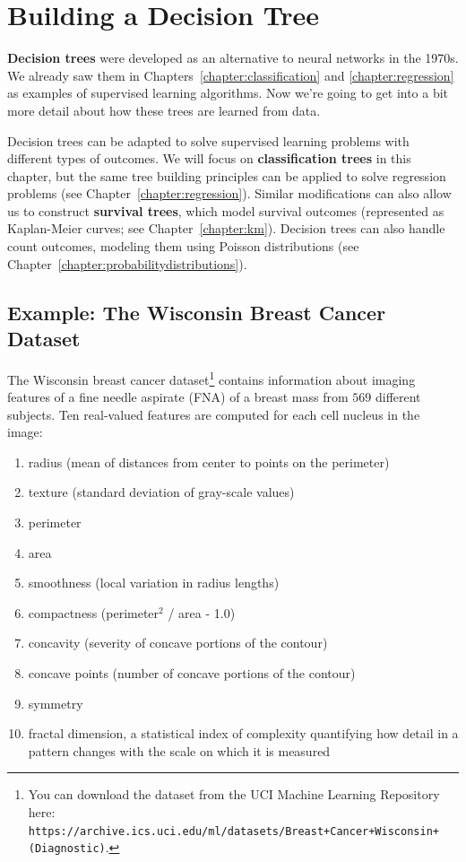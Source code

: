 \chapter{Building a Decision Tree \label{chapter:decisiontrees}}

{\bf Decision trees} were developed as an alternative to neural networks in the 1970s. We already saw them in Chapters~\ref{chapter:classification} and \ref{chapter:regression} as examples of supervised learning algorithms. Now we're going to get into a bit more detail about how these trees are learned from data. 

Decision trees can be adapted to solve supervised learning problems with different types of outcomes. We will focus on \textbf{classification trees} in this chapter, but the same tree building principles can be applied to solve regression problems (see Chapter~\ref{chapter:regression}). Similar modifications can also allow us to construct \textbf{survival trees}, which model survival outcomes (represented as Kaplan-Meier curves; see Chapter~\ref{chapter:km}). Decision trees can also handle count outcomes, modeling them using Poisson distributions (see Chapter~\ref{chapter:probabilitydistributions}).


\section{Example: The Wisconsin Breast Cancer Dataset \label{section:wisconsin}}

The Wisconsin breast cancer dataset\footnote{You can download the dataset from the UCI Machine Learning Repository here: \texttt{https://archive.ics.uci.edu/ml/datasets/Breast+Cancer+Wisconsin+(Diagnostic)}.} contains information about imaging features of a fine needle aspirate (FNA) of a breast mass from $569$ different subjects. Ten real-valued features are computed for each cell nucleus in the image:
{\small
\begin{enumerate}[label=(\alph*)]
\item radius (mean of distances from center to points on the perimeter)
\item texture (standard deviation of gray-scale values)
\item perimeter
\item area
\item smoothness (local variation in radius lengths)
\item compactness (perimeter$^2$ / area - 1.0)
\item concavity (severity of concave portions of the contour)
\item concave points (number of concave portions of the contour)
\item symmetry
\item fractal dimension, a statistical index of complexity quantifying how detail in a pattern changes with the scale on which it is measured
\end{enumerate}
}

